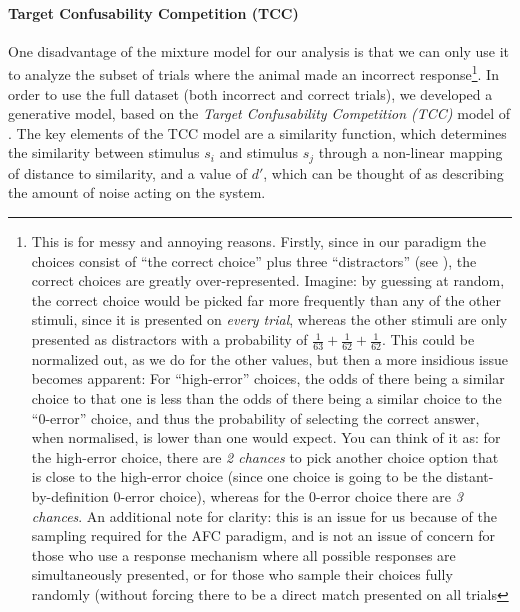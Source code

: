 \paragraph{Target Confusability Competition (TCC)}\label{para:TCC}
One disadvantage of the mixture model for our analysis is that we can only use it to analyze the subset of trials where the animal made an incorrect response\footnote{
This is for messy and annoying reasons. 
Firstly, since in our paradigm the choices consist of ``the correct choice'' plus three ``distractors'' (see ), the correct choices are greatly over-represented. 
Imagine: by guessing at random, the correct choice would be picked far more frequently than any of the other stimuli, since it is presented on \emph{every trial}, whereas the other stimuli are only presented as distractors with a probability of $\frac{1}{63} + \frac{1}{62} + \frac{1}{62}$. 
This could be normalized out, as we do for the other values, but then a more insidious issue becomes apparent: 
For ``high-error'' choices, the odds of there being a similar choice to that one is less than the odds of there being a similar choice to the ``0-error'' choice, and thus the probability of selecting the correct answer, when normalised, is lower than one would expect. 
You can think of it as: for the high-error choice, there are \emph{2 chances} to pick another choice option that is close to the high-error choice (since one choice is going to be the distant-by-definition 0-error choice), whereas for the 0-error choice there are \emph{3 chances}.
An additional note for clarity: this is an issue for us because of the sampling required for the AFC paradigm, and is not an issue of concern for those who use a response mechanism where all possible responses are simultaneously presented, or for those who sample their choices fully randomly (without forcing there to be a direct match presented on all trials
}.
In order to use the full dataset (both incorrect and correct trials), we developed a generative model, based on the \emph{Target Confusability Competition (TCC)} model of \cite{schurgin_psychophysical_2020}.
The key elements of the TCC model are a similarity function, which determines the similarity between stimulus $s_i$ and stimulus $s_j$ through a non-linear mapping of distance to similarity, and a value of $d'$, which can be thought of as describing the amount of noise acting on the system. 
